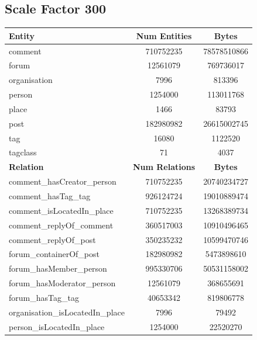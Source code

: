 \subsection{Scale Factor 300}
\begin{table}[H]
    \centering
    \begin{tabular} {| l | c | c |}
        \hline
        \textbf{Entity} & \textbf{Num Entities} & \textbf{Bytes} \\
        \hline
        \hline
        comment & 710752235 & 78578510866 \\
        \hline
        forum & 12561079 & 769736017 \\
        \hline
        organisation & 7996 & 813396 \\
        \hline
        person & 1254000 & 113011768 \\
        \hline
        place & 1466 & 83793 \\
        \hline
        post & 182980982 & 26615002745 \\
        \hline
        tag & 16080 & 1122520 \\
        \hline
        tagclass & 71 & 4037 \\
        \hline
        \hline
        \textbf{Relation} & \textbf{Num Relations} & \textbf{Bytes} \\
        \hline
        \hline
        comment\_hasCreator\_person & 710752235 & 20740234727 \\
        \hline
        comment\_hasTag\_tag & 926124724 & 19010889474 \\
        \hline
        comment\_isLocatedIn\_place & 710752235 & 13268389734 \\
        \hline
        comment\_replyOf\_comment & 360517003 & 10910496465 \\
        \hline
        comment\_replyOf\_post & 350235232 & 10599470746 \\
        \hline
        forum\_containerOf\_post & 182980982 & 5473898610 \\
        \hline
        forum\_hasMember\_person & 995330706 & 50531158002 \\
        \hline
        forum\_hasModerator\_person & 12561079 & 368655691 \\
        \hline
        forum\_hasTag\_tag & 40653342 & 819806778 \\
        \hline
        organisation\_isLocatedIn\_place & 7996 & 79492 \\
        \hline
        person\_isLocatedIn\_place & 1254000 & 22520270 \\

\end{tabular}
\end{table}
